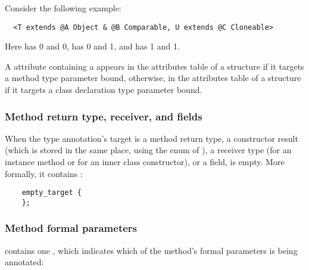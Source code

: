 \documentclass[10pt]{article}
\newcommand{\preverbnegspace}{\vspace{-5pt}}
\begin{document}
Consider the following
example:

\preverbnegspace
\begin{Verbatim}
  <T extends @A Object & @B Comparable, U extends @C Cloneable>
\end{Verbatim}

\noindent
Here
 has  0 and  0,
 has  0 and  1, and
 has  1 and  1.

A \RuntimeInOrVisibleTypeAnnotations attribute containing a
 appears in the attributes table of a
 structure if it targets a method type parameter bound,
otherwise, in the attributes table of a  structure if it
targets a class declaration type parameter bound.


\subsubsection{Method return type, receiver, and fields\label{class-file:ext:ri:return}\label{class-file:ext:ri:receiver}}

When the type annotation's target is a method return type, a constructor
result (which is stored in the same place, using the 
enum of ), a receiver type (for an instance method or for an inner class
constructor), or a field,  is empty.
More formally, it contains :

\preverbnegspace
\begin{Verbatim}
    empty_target {
    };
\end{Verbatim}



\subsubsection{Method formal parameters\label{class-file:ext:ri:formal-parameters}}

 contains one , which
indicates which of the method's formal parameters is being annotated:
\end{document}
